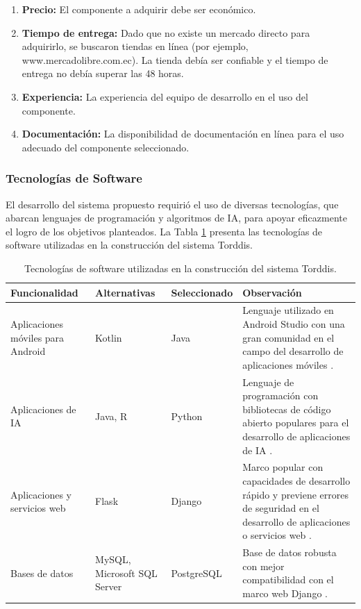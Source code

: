\documentclass[a4paper,fleqn]{cas-sc}
\begin{document}
		\begin{enumerate}
			\item \textbf{Precio:} El componente a adquirir debe ser económico.
			\item \textbf{Tiempo de entrega:} Dado que no existe un mercado directo para adquirirlo, se buscaron tiendas en línea (por ejemplo, www.mercadolibre.com.ec). La tienda debía ser confiable y el tiempo de entrega no debía superar las 48 horas.
			\item \textbf{Experiencia:} La experiencia del equipo de desarrollo en el uso del componente.
			\item \textbf{Documentación:} La disponibilidad de documentación en línea para el uso adecuado del componente seleccionado.
		\end{enumerate}
		
		\subsubsection*{Tecnologías de Software}
		El desarrollo del sistema propuesto requirió el uso de diversas tecnologías, que abarcan lenguajes de programación y algoritmos de IA, para apoyar eficazmente el logro de los objetivos planteados. La Tabla \ref{table:software-technologies} presenta las tecnologías de software utilizadas en la construcción del sistema Torddis.
		
		\begin{table}[hbt]
			\caption{Tecnologías de software utilizadas en la construcción del sistema Torddis.}
			\label{table:software-technologies}
			\centering
			\begin{tabular}{p{}p{0.15\textwidth}p{}p{}}
				\hline
				\multicolumn{1}{l}{\textbf{Funcionalidad}} & \multicolumn{1}{l}{\textbf{Alternativas }} & \multicolumn{1}{l}{\textbf{Seleccionado}} & \multicolumn{1}{l}{\textbf{Observación}} \\ \hline
				Aplicaciones móviles para Android & Kotlin & Java & Lenguaje utilizado en Android Studio con una gran comunidad en el campo del desarrollo de aplicaciones móviles \citep{Sharma2021Real-Time}. \\
				Aplicaciones de IA & Java, R & Python & Lenguaje de programación con bibliotecas de código abierto populares para el desarrollo de aplicaciones de IA \citep{Cai2005OnThePerformance}. \\
				Aplicaciones y servicios web & Flask & Django & Marco popular con capacidades de desarrollo rápido y previene errores de seguridad en el desarrollo de aplicaciones o servicios web \citep{Puneet2022ADjango}. \\
				Bases de datos & MySQL, Microsoft SQL Server & PostgreSQL & Base de datos robusta con mejor compatibilidad con el marco web Django \citep{Puneet2022ADjango}. \\ \hline
			\end{tabular}
		\end{table}
		
\end{document}
